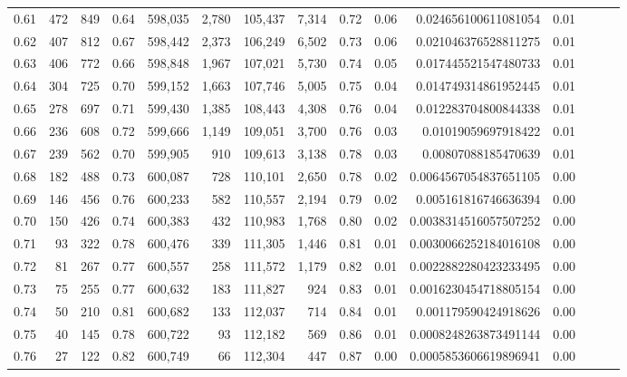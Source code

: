 \begin{tabular}{rrrrrrrrrrrrrrr}
0.61 &     472 &    849 &  0.64 &  598,035 &    2,780 &  105,437 &    7,314 &  0.72 &  0.06 &    0.024656100611081054 &      0.01 \\
0.62 &     407 &    812 &  0.67 &  598,442 &    2,373 &  106,249 &    6,502 &  0.73 &  0.06 &    0.021046376528811275 &      0.01 \\
0.63 &     406 &    772 &  0.66 &  598,848 &    1,967 &  107,021 &    5,730 &  0.74 &  0.05 &    0.017445521547480733 &      0.01 \\
0.64 &     304 &    725 &  0.70 &  599,152 &    1,663 &  107,746 &    5,005 &  0.75 &  0.04 &    0.014749314861952445 &      0.01 \\
0.65 &     278 &    697 &  0.71 &  599,430 &    1,385 &  108,443 &    4,308 &  0.76 &  0.04 &    0.012283704800844338 &      0.01 \\
0.66 &     236 &    608 &  0.72 &  599,666 &    1,149 &  109,051 &    3,700 &  0.76 &  0.03 &     0.01019059697918422 &      0.01 \\
0.67 &     239 &    562 &  0.70 &  599,905 &      910 &  109,613 &    3,138 &  0.78 &  0.03 &     0.00807088185470639 &      0.01 \\
0.68 &     182 &    488 &  0.73 &  600,087 &      728 &  110,101 &    2,650 &  0.78 &  0.02 &   0.0064567054837651105 &      0.00 \\
0.69 &     146 &    456 &  0.76 &  600,233 &      582 &  110,557 &    2,194 &  0.79 &  0.02 &    0.005161816746636394 &      0.00 \\
0.70 &     150 &    426 &  0.74 &  600,383 &      432 &  110,983 &    1,768 &  0.80 &  0.02 &   0.0038314516057507252 &      0.00 \\
0.71 &      93 &    322 &  0.78 &  600,476 &      339 &  111,305 &    1,446 &  0.81 &  0.01 &   0.0030066252184016108 &      0.00 \\
0.72 &      81 &    267 &  0.77 &  600,557 &      258 &  111,572 &    1,179 &  0.82 &  0.01 &   0.0022882280423233495 &      0.00 \\
0.73 &      75 &    255 &  0.77 &  600,632 &      183 &  111,827 &      924 &  0.83 &  0.01 &   0.0016230454718805154 &      0.00 \\
0.74 &      50 &    210 &  0.81 &  600,682 &      133 &  112,037 &      714 &  0.84 &  0.01 &    0.001179590424918626 &      0.00 \\
0.75 &      40 &    145 &  0.78 &  600,722 &       93 &  112,182 &      569 &  0.86 &  0.01 &   0.0008248263873491144 &      0.00 \\
0.76 &      27 &    122 &  0.82 &  600,749 &       66 &  112,304 &      447 &  0.87 &  0.00 &   0.0005853606619896941 &      0.00 \\

\end{tabular}
